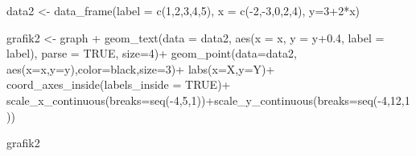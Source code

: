 \documentclass[
  letterpaper,
  DIV=11,
  numbers=noendperiod]{scrartcl}
\newenvironment{Shaded}{\begin{snugshade}}{\end{snugshade}}
\newcommand{\AttributeTok}[1]{\textcolor[rgb]{0.40,0.45,0.13}{#1}}
\newcommand{\ConstantTok}[1]{\textcolor[rgb]{0.56,0.35,0.01}{#1}}
\newcommand{\DecValTok}[1]{\textcolor[rgb]{0.68,0.00,0.00}{#1}}
\newcommand{\FloatTok}[1]{\textcolor[rgb]{0.68,0.00,0.00}{#1}}
\newcommand{\FunctionTok}[1]{\textcolor[rgb]{0.28,0.35,0.67}{#1}}
\newcommand{\NormalTok}[1]{\textcolor[rgb]{0.00,0.23,0.31}{#1}}
\newcommand{\OtherTok}[1]{\textcolor[rgb]{0.00,0.23,0.31}{#1}}
\newcommand{\SpecialCharTok}[1]{\textcolor[rgb]{0.37,0.37,0.37}{#1}}
\newcommand{\StringTok}[1]{\textcolor[rgb]{0.13,0.47,0.30}{#1}}
\begin{document}
\begin{Shaded}
\begin{Highlighting}[]
\NormalTok{data2 }\OtherTok{\textless{}{-}} \FunctionTok{data\_frame}\NormalTok{(}\AttributeTok{label =} \FunctionTok{c}\NormalTok{(}\DecValTok{1}\NormalTok{,}\DecValTok{2}\NormalTok{,}\DecValTok{3}\NormalTok{,}\DecValTok{4}\NormalTok{,}\DecValTok{5}\NormalTok{),}
                            \AttributeTok{x =} \FunctionTok{c}\NormalTok{(}\SpecialCharTok{{-}}\DecValTok{2}\NormalTok{,}\SpecialCharTok{{-}}\DecValTok{3}\NormalTok{,}\DecValTok{0}\NormalTok{,}\DecValTok{2}\NormalTok{,}\DecValTok{4}\NormalTok{),}
                            \AttributeTok{y=}\DecValTok{3}\SpecialCharTok{+}\DecValTok{2}\SpecialCharTok{*}\NormalTok{x)}
                          
\NormalTok{grafik2 }\OtherTok{\textless{}{-}}\NormalTok{ graph }\SpecialCharTok{+}
  \FunctionTok{geom\_text}\NormalTok{(}\AttributeTok{data =}\NormalTok{ data2,}
            \FunctionTok{aes}\NormalTok{(}\AttributeTok{x =}\NormalTok{ x, }\AttributeTok{y =}\NormalTok{ y}\FloatTok{+0.4}\NormalTok{, }\AttributeTok{label =}\NormalTok{ label), }\AttributeTok{parse =} \ConstantTok{TRUE}\NormalTok{,}
            \AttributeTok{size=}\DecValTok{4}\NormalTok{)}\SpecialCharTok{+}
  \FunctionTok{geom\_point}\NormalTok{(}\AttributeTok{data=}\NormalTok{data2,}
             \FunctionTok{aes}\NormalTok{(}\AttributeTok{x=}\NormalTok{x,}\AttributeTok{y=}\NormalTok{y),}\AttributeTok{color=}\StringTok{\textquotesingle{}black\textquotesingle{}}\NormalTok{,}\AttributeTok{size=}\DecValTok{3}\NormalTok{)}\SpecialCharTok{+}
  \FunctionTok{labs}\NormalTok{(}\AttributeTok{x=}\StringTok{\textquotesingle{}X\textquotesingle{}}\NormalTok{,}\AttributeTok{y=}\StringTok{\textquotesingle{}Y\textquotesingle{}}\NormalTok{)}\SpecialCharTok{+}
  \FunctionTok{coord\_axes\_inside}\NormalTok{(}\AttributeTok{labels\_inside =} \ConstantTok{TRUE}\NormalTok{)}\SpecialCharTok{+}
  \FunctionTok{scale\_x\_continuous}\NormalTok{(}\AttributeTok{breaks=}\FunctionTok{seq}\NormalTok{(}\SpecialCharTok{{-}}\DecValTok{4}\NormalTok{,}\DecValTok{5}\NormalTok{,}\DecValTok{1}\NormalTok{))}\SpecialCharTok{+}\FunctionTok{scale\_y\_continuous}\NormalTok{(}\AttributeTok{breaks=}\FunctionTok{seq}\NormalTok{(}\SpecialCharTok{{-}}\DecValTok{4}\NormalTok{,}\DecValTok{12}\NormalTok{,}\DecValTok{1}\NormalTok{))}

\NormalTok{grafik2}
\end{Highlighting}
\end{Shaded}
\end{document}
